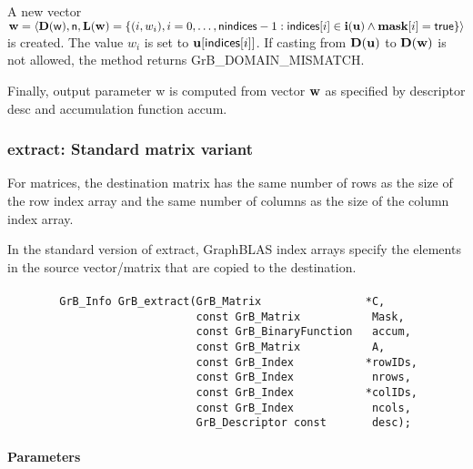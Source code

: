 A new vector ${\bf w} = \langle \bold{D}({\sf w}),{\sf n},
\bold{L}({\bf w}) = \{ (i,w_i), i = 0,\ldots,{\sf nindices}-1 : {\sf indices}[i]
\in \bold{i}({\bf u}) \wedge {\bf mask}[i] = {\sf true} \} \rangle$
is created.  The value $w_i$ is set to ${\bf u}[{\sf indices}[i]]$. If
casting from $\bold{D}({\bf u})$ to $\bold{D}({\bf w})$ is not
allowed, the method returns {\sf GrB\_DOMAIN\_MISMATCH}.

Finally, output parameter {\sf w} is computed from vector ${\bf w}$ as
specified by descriptor {\sf desc} and accumulation function {\sf accum}.



\subsubsection{{\sf extract}: Standard matrix variant}

For matrices, the destination matrix has
the same number of rows as the size of the row index array and the same
number of columns as the size of the column index array.

In the standard version of {\sf extract}, GraphBLAS index arrays
specify the elements in the source vector/matrix that are copied to
the destination. 


\paragraph{\syntax}

\begin{verbatim}                 
        GrB_Info GrB_extract(GrB_Matrix                *C,
                             const GrB_Matrix           Mask,
                             const GrB_BinaryFunction   accum,
                             const GrB_Matrix           A,
                             const GrB_Index           *rowIDs,
                             const GrB_Index            nrows,
                             const GrB_Index           *colIDs,
                             const GrB_Index            ncols,
                             GrB_Descriptor const       desc);
\end{verbatim}

\paragraph{Parameters}

